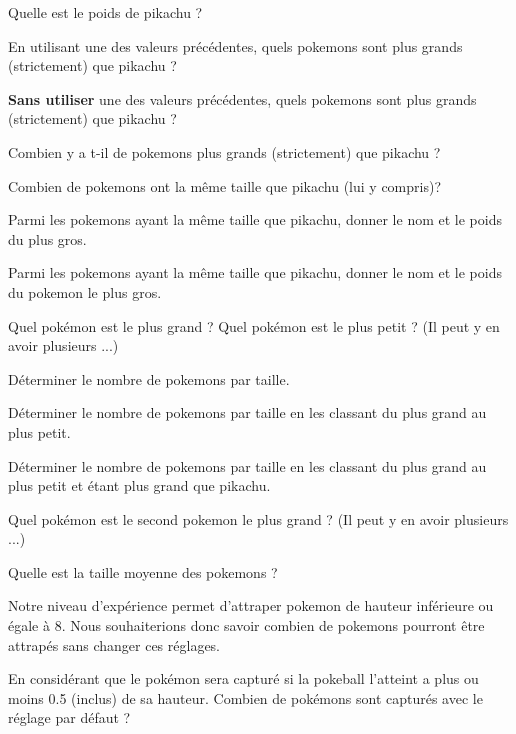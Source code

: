 \question{}
Quelle est le poids de pikachu ?

\question{}
En utilisant une des valeurs précédentes, quels pokemons sont plus grands (strictement) que pikachu ?

\question{}
\textbf{Sans utiliser} une des valeurs précédentes, quels pokemons sont plus grands (strictement) que pikachu ?

\question{}
Combien y a t-il de pokemons plus grands (strictement) que pikachu ?

\question{}
Combien de pokemons ont la même taille que pikachu (lui y compris)? 

\question{}
Parmi les pokemons ayant la même taille que pikachu, donner le nom et le poids du plus gros. 






\question{}
Parmi les pokemons ayant la même taille que pikachu, donner le nom et le poids du pokemon le plus gros.

\question{}
Quel pokémon est le plus grand ? Quel pokémon est le plus petit ? (Il peut y en avoir plusieurs ...)

\question{}
Déterminer le nombre de pokemons par taille. 

\question{}
Déterminer le nombre de pokemons par taille en les classant du plus grand au plus petit. 


\question{}
Déterminer le nombre de pokemons par taille en les classant du plus grand au plus petit et étant plus grand que pikachu.


\question{}
Quel pokémon est le second pokemon le plus grand ? (Il peut y en avoir plusieurs ...)


\question{}
Quelle est la taille moyenne des pokemons ?



Notre niveau d'expérience permet d'attraper pokemon de hauteur inférieure ou égale à 8. 
Nous souhaiterions donc savoir combien de pokemons pourront être attrapés sans changer ces réglages.

\question{}
En considérant que le pokémon sera capturé si la pokeball l'atteint a plus ou moins 0.5 (inclus) de sa hauteur. Combien de pokémons sont capturés avec le réglage par défaut ?


